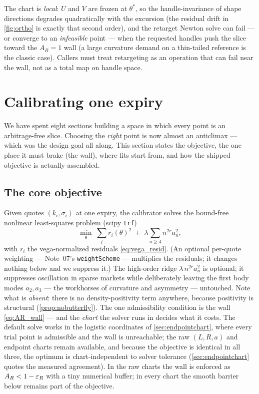 \documentclass[11pt]{article}
\begin{document}
\begin{caution}
The chart is \emph{local}: $U$ and $V$ are frozen at $\theta^{*}$, so the
handle-invariance of shape directions degrades quadratically with the
excursion (the residual drift in \cref{fig:ortho} is exactly that second
order), and the retarget Newton solve can fail --- or converge to an
\emph{infeasible} point --- when the requested handles push the slice toward
the $A_R=1$ wall (a large curvature demand on a thin-tailed reference is the
classic case).  Callers must treat retargeting as an operation that can
fail near the wall, not as a total map on handle space.
\end{caution}

\section{Calibrating one expiry}
\label{sec:calib}

We have spent eight sections building a space in which every point is an
arbitrage-free slice.  Choosing the \emph{right} point is now almost an
anticlimax --- which was the design goal all along.  This section states the
objective, the one place it must brake (the wall), where fits start from,
and how the shipped objective is actually assembled.

\subsection{The core objective}

Given quotes $(k_i,\sigma_i)$ at one expiry, the calibrator solves the
bound-free nonlinear least-squares problem (scipy \texttt{trf})
\begin{equation}
\min_{\theta}\;
\sum_i r_i(\theta)^{2}
\;+\;\lambda\sum_{n\ge4}n^{2r}a_n^{2},
\label{eq:calib_objective}
\end{equation}
with $r_i$ the vega-normalized residuals \eqref{eq:vega_resid}.  (An
optional per-quote weighting --- Note~07's \texttt{weightScheme} ---
multiplies the residuals; it changes nothing below and we suppress it.)
The high-order ridge $\lambda\,n^{2r}a_n^{2}$ is optional; it suppresses
oscillation in sparse markets while deliberately leaving the first body modes
$a_2,a_3$ --- the workhorses of curvature and asymmetry --- untouched.  Note
what is \emph{absent}: there is no density-positivity term anywhere, because
positivity is structural (\cref{prop:nobutterfly}).  The one admissibility
condition is the wall \eqref{eq:AR_wall} --- and the \emph{chart} the solver
runs in decides what it costs.  The default solve works in the logistic
coordinates of \cref{sec:endpointchart}, where every trial point is
admissible and the wall is unreachable; the raw $(L,R,a)$ and endpoint
charts remain available, and because the objective is identical in all
three, the optimum is chart-independent to solver tolerance
(\cref{sec:endpointchart} quotes the measured agreement).  In the raw
charts the wall is enforced as $A_R<1-\varepsilon_R$ with a tiny numerical buffer;
in every chart the smooth barrier below remains part of the objective.
\end{document}
